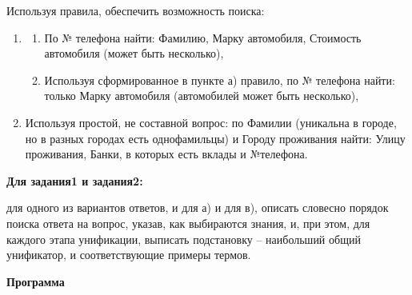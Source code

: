 \documentclass[a4paper,14pt]{extreport} %
\begin{document}
\hfill

Используя правила, обеспечить возможность поиска:

\begin{enumerate}
\item 
\begin{enumerate}
\item По № телефона найти: Фамилию, Марку автомобиля, Стоимость автомобиля (может быть несколько),
\item Используя сформированное в пункте а) правило, по № телефона найти: только Марку автомобиля (автомобилей может быть несколько),
\end{enumerate}
\item Используя простой, не составной вопрос: по Фамилии (уникальна в городе, но в разных городах есть однофамильцы) и Городу проживания найти:  Улицу проживания, Банки, в которых есть вклады и №телефона. 
\end{enumerate}

\textbf{Для задания1 и задания2: }

для одного из вариантов ответов, и для а) и для в), описать словесно порядок поиска ответа на вопрос, указав, как выбираются знания, и, при этом, для каждого этапа унификации, выписать подстановку – наибольший общий унификатор, и соответствующие примеры термов.

\hfill

\textbf{Программа}
\end{document}
